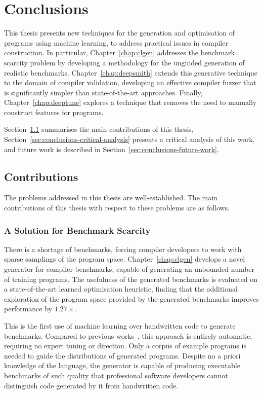 \chapter{Conclusions}
\label{chap:conclusions}

This thesis presents new techniques for the generation and optimisation of programs using machine learning, to address practical issues in compiler construction. In particular, Chapter~\ref{chap:clgen} addresses the benchmark scarcity problem by developing a methodology for the unguided generation of realistic benchmarks. Chapter~\ref{chap:deepsmith} extends this generative technique to the domain of compiler validation, developing an effective compiler fuzzer that is significantly simpler than state-of-the-art approaches. Finally, Chapter~\ref{chap:deeptune} explores a technique that removes the need to manually construct features for programs.

Section~\ref{sec:conclusions-contributions} summarises the main contributions of this thesis, Section~\ref{sec:conclusions-critical-analysis} presents a critical analysis of this work, and future work is described in Section~\ref{sec:conclusions-future-work}.


\section{Contributions}
\label{sec:conclusions-contributions}

The problems addressed in this thesis are well-established. The main contributions of this thesis with respect to these problems are as follows.


\subsection{A Solution for Benchmark Scarcity}

There is a shortage of benchmarks, forcing compiler developers to work with sparse samplings of the program space. Chapter~\ref{chap:clgen} develops a novel generator for compiler benchmarks, capable of generating an unbounded number of training programs. The usefulness of the generated benchmarks is evaluated on a state-of-the-art learned optimisation heuristic, finding that the additional exploration of the program space provided by the generated benchmarks improves performance by $1.27\times$.

This is the first use of machine learning over handwritten code to generate benchmarks. Compared to previous works~\cite{Chiu2015}, this approach is entirely automatic, requiring no expert tuning or direction. Only a corpus of example programs is needed to guide the distributions of generated programs. Despite no a priori knowledge of the language, the generator is capable of producing executable benchmarks of such quality that professional software developers cannot distinguish code generated by it from handwritten code.

